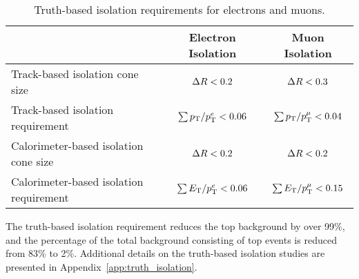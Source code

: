 \begin{table}[htp]
  \centering
  \begin{tabular}{l|c|c}
    ~       &   Electron Isolation & Muon Isolation \\
    \hline\hline
    Track-based isolation cone size   	    &   $\Delta R < 0.2$          & $\Delta R < 0.3$ \\
    Track-based isolation requirement       &   $\sum p_{\mathrm{T}}/p_{\mathrm{T}}^{e} <  0.06$ & $\sum p_{\mathrm{T}}/p_{\mathrm{T}}^{\mu} <  0.04$	\\
    Calorimeter-based isolation cone size   &   $\Delta R < 0.2$	         & $\Delta R < 0.2$\\
    Calorimeter-based isolation requirement &   $\sum E_{\mathrm{T}}/p_{\mathrm{T}}^{e} <  0.06$ & $\sum E_{\mathrm{T}}/p_{\mathrm{T}}^{\mu} <  0.15$	\\
    \hline
  \end{tabular}
  \caption{Truth-based isolation requirements for electrons and muons.} 
  \label{tab:truth_iso_definition}
\end{table}

The truth-based isolation requirement reduces the top background by over 99\%, and the percentage of the total background consisting of top events is reduced from 83\% to 2\%.
Additional details on the truth-based isolation studies are presented in Appendix~\ref{app:truth_isolation}.
